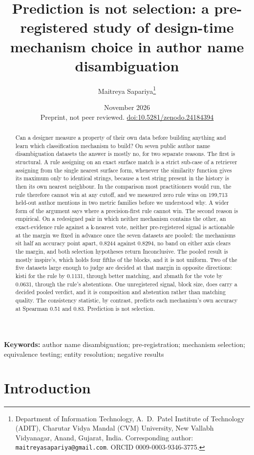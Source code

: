 \documentclass[11pt]{article}
\title{Prediction is not selection: a pre-registered study of design-time
mechanism choice in author name disambiguation}
\author{Maitreya Sapariya\thanks{Department of Information Technology,
A.~D.~Patel Institute of Technology (ADIT), Charutar Vidya Mandal (CVM)
University, New Vallabh Vidyanagar, Anand, Gujarat, India. Corresponding
author: \texttt{maitreyasapariya@gmail.com}. ORCID 0009-0003-9346-3775.}}
\date{November 2026\\[0.5ex]\small Preprint, not peer reviewed. \href{https://doi.org/10.5281/zenodo.24184394}{doi:10.5281/zenodo.24184394}}
\begin{document}
\maketitle

\begin{abstract}
Can a designer measure a property of their own data before building anything
and learn which classification mechanism to build? On seven public author name
disambiguation datasets the answer is mostly no, for two separate reasons. The
first is structural. A rule assigning on an exact surface match is a strict
sub-case of a retriever assigning from the single nearest surface form,
whenever the similarity function gives its maximum only to identical strings,
because a test string present in the history is then its own nearest
neighbour. In the comparison most practitioners would run, the rule therefore
cannot win at any cutoff, and we measured zero rule wins on 199{,}713 held-out
author mentions in two metric families before we understood why. A wider form
of the argument says where a precision-first rule cannot win. The second
reason is empirical. On a redesigned pair in which neither mechanism contains
the other, an exact-evidence rule against a k-nearest vote, neither
pre-registered signal is actionable at the margin we fixed in advance once the
seven datasets are pooled: the mechanisms sit half an accuracy point apart,
0.8244 against 0.8294, no band on either axis clears the margin, and both
selection hypotheses return Inconclusive. The pooled result is mostly
inspire's, which holds four fifths of the blocks, and it is not uniform. Two
of the five datasets large enough to judge are decided at that margin in
opposite directions: kisti for the rule by 0.1131, through better matching,
and zbmath for the vote by 0.0631, through the rule's abstentions. One
unregistered signal, block size, does carry a decided pooled verdict, and it
is composition and abstention rather than matching quality. The consistency
statistic, by contrast, predicts each mechanism's own accuracy at Spearman
0.51 and 0.83. Prediction is not selection.
\end{abstract}

\vspace{0.5\baselineskip}
\noindent\textbf{Keywords:} author name disambiguation; pre-registration;
mechanism selection; equivalence testing; entity resolution; negative results
\vspace{0.5\baselineskip}

\section{Introduction}
\label{sec:intro}
\end{document}
